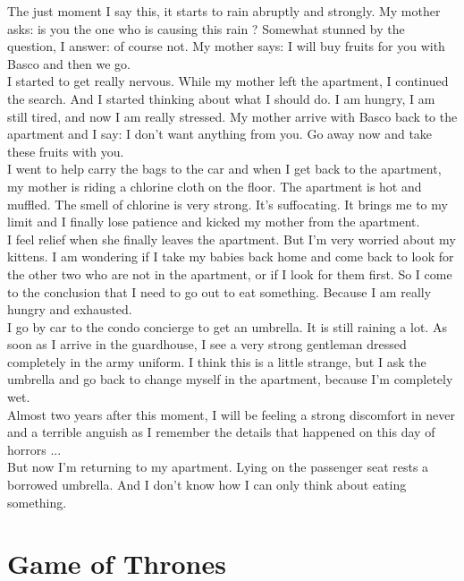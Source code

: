 \documentclass[11pt]{book}
\begin{document}
\noindent The just moment I say this, it starts to rain abruptly and strongly. My mother asks: is you the one who is causing this rain ? Somewhat stunned by the question, I answer: of course not. My mother says: I will buy fruits for you with Basco and then we go. \\

\noindent I started to get really nervous. While my mother left the apartment, I continued the search. And I started thinking about what I should do. I am hungry, I am still tired, and now I am really stressed. My mother arrive with Basco back to the apartment and I say: I don't want anything from you. Go away now and take these fruits with you. \\

\noindent I went to help carry the bags to the car and when I get back to the apartment, my mother is riding a chlorine cloth on the floor. The apartment is hot and muffled. The smell of chlorine is very strong. It's suffocating. It brings me to my limit and I finally lose patience and kicked my mother from the apartment. \\

\noindent I feel relief when she finally leaves the apartment. But I'm very worried about my kittens. I am wondering if I take my babies back home and come back to look for the other two who are not in the apartment, or if I look for them first. So I come to the conclusion that I need to go out to eat something. Because I am really hungry and exhausted. \\

\noindent I go by car to the condo concierge to get an umbrella. It is still raining a lot. As soon as I arrive in the guardhouse, I see a very strong gentleman dressed completely in the army uniform. I think this is a little strange, but I ask the umbrella and go back to change myself in the apartment, because I'm completely wet. \\

\noindent Almost two years after this moment, I will be feeling a strong discomfort in never and a terrible anguish as I remember the details that happened on this day of horrors ... \\

\noindent But now I'm returning to my apartment. Lying on the passenger seat rests a borrowed umbrella. And I don't know how I can only think about eating something. \\

\chapter{Game of Thrones}
\end{document}
